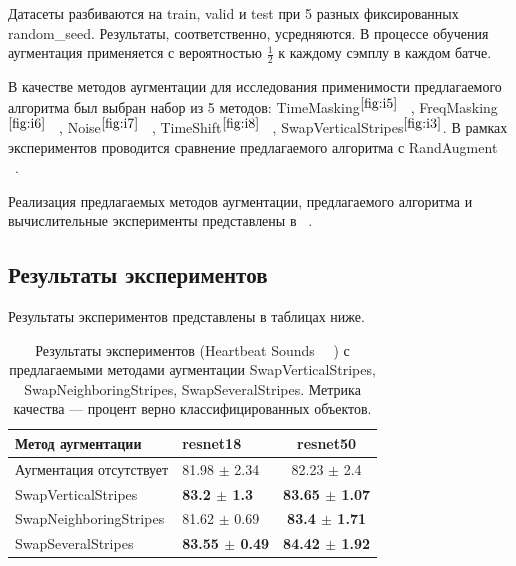 \documentclass[12pt, fleqn]{article}
\begin{document}
Датасеты разбиваются на train, valid и test при 5 разных фиксированных random\_seed. Результаты, соответственно, усредняются. В процессе обучения аугментация применяется с вероятностью $\frac{1}{2}$ к каждому сэмплу в каждом батче.

В качестве методов аугментации для исследования применимости предлагаемого алгоритма был выбран набор из 5 методов: TimeMasking$^{\ref{fig:i5}}$ ~\cite{SpecAugment}, FreqMasking$^{\ref{fig:i6}}$ ~\cite{SpecAugment}, Noise$^{\ref{fig:i7}}$ ~\cite{AudioClassification}, TimeShift$^{\ref{fig:i8}}$ ~\cite{AudioClassification}, SwapVerticalStripes$^{\ref{fig:i3}}$. В рамках экспериментов проводится сравнение предлагаемого алгоритма с RandAugment ~\cite{RandAugment}.

Реализация предлагаемых методов аугментации, предлагаемого алгоритма и вычислительные эксперименты представлены в ~\cite{Experiments}.

\subsection{Результаты экспериментов}

Результаты экспериментов представлены в таблицах ниже.
\begin{table}[ht!]
    \centering
	\begin{tabular}{| l | l | c |}
    	\hline
	    Метод аугментации & resnet18 & resnet50 \\ \hline
	    Аугментация отсутствует  & 81.98 $\pm$ 2.34 & 82.23 $\pm$ 2.4 \\ \hline
	    SwapVerticalStripes & \textbf{83.2 $\pm$ 1.3} & \textbf{83.65 $\pm$ 1.07} \\ \hline
	    SwapNeighboringStripes & 81.62 $\pm$ 0.69 & \textbf{83.4 $\pm$ 1.71} \\ \hline
	    SwapSeveralStripes & \textbf{83.55 $\pm$ 0.49} & \textbf{84.42 $\pm$ 1.92} \\ \hline
	\end{tabular}
	\caption{Результаты экспериментов (Heartbeat Sounds ~\cite{HeartbeatSoundsArticle}~\cite{HeartbeatSoundsKaggle}) с предлагаемыми методами аугментации SwapVerticalStripes, SwapNeighboringStripes, SwapSeveralStripes. Метрика качества --- процент верно классифицированных объектов.}
	\label{table:lukianov_pavel_t1}
\end{table}
\end{document}
